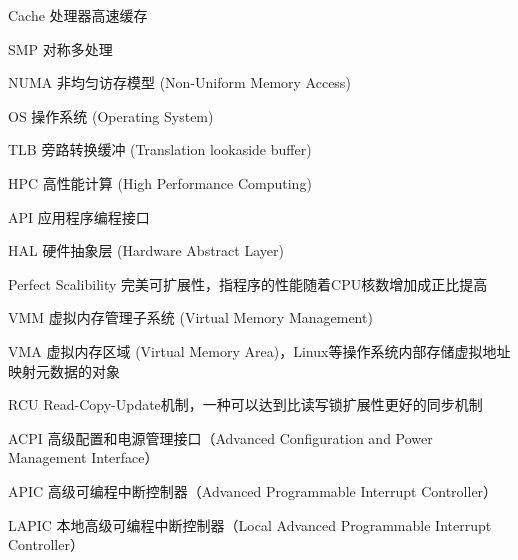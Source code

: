 \begin{denotation}

\item[Cache] 处理器高速缓存
\item[SMP] 对称多处理
\item[NUMA] 非均匀访存模型 (Non-Uniform Memory Access)
\item[OS] 操作系统 (Operating System)
\item[TLB] 旁路转换缓冲 (Translation lookaside buffer)
\item[HPC] 高性能计算 (High Performance Computing)
\item[API] 应用程序编程接口
\item[HAL] 硬件抽象层 (Hardware Abstract Layer)
\item[Perfect Scalibility]
	完美可扩展性，指程序的性能随着CPU核数增加成正比提高
\item[VMM] 虚拟内存管理子系统 (Virtual Memory Management)
\item[VMA] 虚拟内存区域 (Virtual Memory
	Area)，Linux等操作系统内部存储虚拟地址映射元数据的对象
\item[RCU]
	Read-Copy-Update机制，一种可以达到比读写锁扩展性更好的同步机制
\item[ACPI] 高级配置和电源管理接口（Advanced Configuration and Power Management Interface）
\item[APIC] 高级可编程中断控制器（Advanced Programmable Interrupt Controller）
\item[LAPIC] 本地高级可编程中断控制器（Local Advanced Programmable Interrupt Controller）
\end{denotation}
